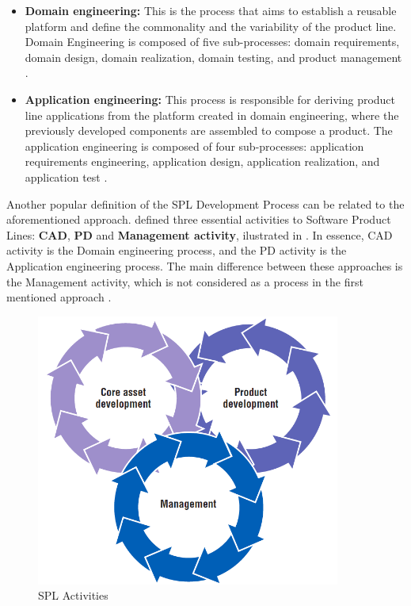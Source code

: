 \begin{itemize}
\item \textbf{Domain engineering:} This is the process that aims to establish a reusable 
platform and define the commonality and the variability of the product line. Domain Engineering 
is composed of five sub-processes: domain requirements, domain design, domain realization, domain 
testing, and product management \citep{Pohl2005}. 
\item \textbf{Application engineering:} This process is responsible for deriving
product line applications from the platform created in domain engineering, where the previously 
developed components are assembled to compose a product. The application engineering is composed 
of four sub-processes: application requirements engineering, application design, application realization, 
and application test \citep{Pohl2005}.  
\end{itemize}

Another popular  definition of the \acf{SPL} Development
Process  can be related to the aforementioned approach. \citep{clements2002software} 
defined three essential activities to Software Product Lines:
\textbf{\acf{CAD}}, \textbf{\acf{PD}} and \textbf{Management activity},
ilustrated in .
In essence, \acf{CAD} activity is the Domain engineering process, 
and the \acf{PD} activity is the Application engineering process. 
The main difference between these approaches is the Management activity, which is not considered 
as a process in the first mentioned approach \citep{Pohl2005}. 

\begin{figure}[htp]
\begin{center}
  \includegraphics[width=10cm]{chapters/background/img/SPLactivities.png}
  \caption[SPL Activities]{SPL Activities \citep{clements2002software}}
  \label{fg:spl-activities}
\end{center}
\end{figure}

